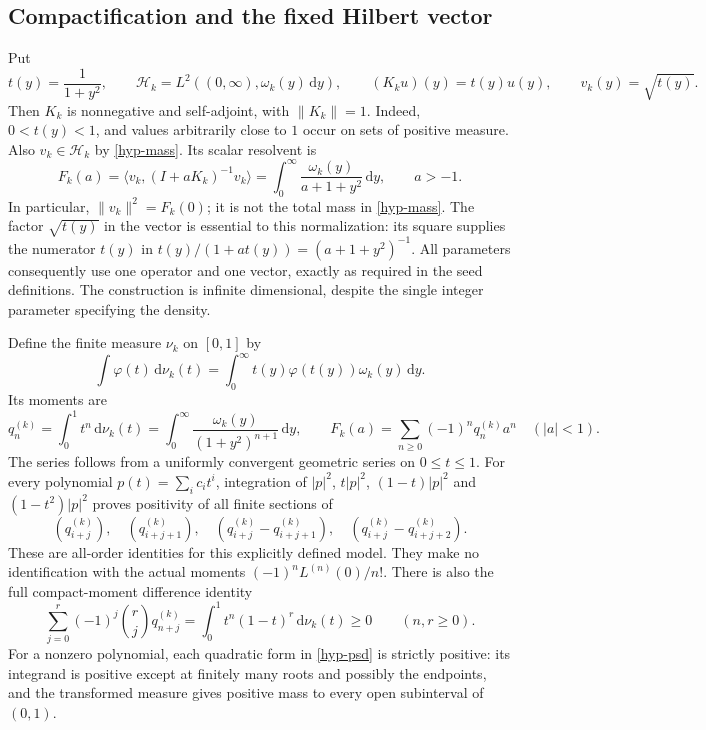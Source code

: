 \documentclass[11pt,a4paper]{article}
\numberwithin{equation}{section}
\theoremstyle{definition}
\theoremstyle{remark}
\newcommand{\HH}{\mathcal H}
\newcommand{\ip}[2]{\langle #1,#2\rangle}
\newcommand{\norm}[1]{\lVert #1\rVert}
\newcommand{\dd}{\,\mathrm d}
\begin{document}
\subsection{Compactification and the fixed Hilbert vector}

Put
\begin{equation}\label{hyp-compactification}
t(y)=\frac1{1+y^2},\qquad
\HH_k=L^2((0,\infty),\omega_k(y)\dd y),\qquad
(K_ku)(y)=t(y)u(y),\qquad v_k(y)=\sqrt{t(y)}.
\end{equation}
Then $K_k$ is nonnegative and self-adjoint, with $\norm{K_k}=1$.
Indeed, $0<t(y)<1$, and values arbitrarily close to $1$ occur on
sets of positive measure. Also $v_k\in\HH_k$ by
\eqref{hyp-mass}. Its scalar resolvent is
\begin{equation}\label{hyp-resolvent}
F_k(a)=\ip{v_k}{(I+aK_k)^{-1}v_k}
=\int_0^\infty\frac{\omega_k(y)}{a+1+y^2}\dd y,
\qquad a>-1.
\end{equation}
In particular, $\norm{v_k}^2=F_k(0)$; it is not the total mass in
\eqref{hyp-mass}.
The factor $\sqrt{t(y)}$ in the vector is essential to this
normalization: its square supplies the numerator $t(y)$ in
$t(y)/(1+at(y))=(a+1+y^2)^{-1}$. All parameters consequently use
one operator and one vector, exactly as required in the seed definitions.
The construction is infinite dimensional, despite the single integer
parameter specifying the density.

Define the finite measure $\nu_k$ on $[0,1]$ by
\[
\int\varphi(t)\dd\nu_k(t)
=\int_0^\infty t(y)\varphi(t(y))\omega_k(y)\dd y.
\]
Its moments are
\begin{equation}\label{hyp-compact-moments}
q_n^{(k)}=\int_0^1t^n\dd\nu_k(t)
=\int_0^\infty\frac{\omega_k(y)}{(1+y^2)^{n+1}}\dd y,
\qquad
F_k(a)=\sum_{n\geq0}(-1)^nq_n^{(k)}a^n\quad(|a|<1).
\end{equation}
The series follows from a uniformly convergent geometric series on
$0\leq t\leq1$. For every polynomial $p(t)=\sum_i c_it^i$,
integration of $|p|^2$, $t|p|^2$, $(1-t)|p|^2$ and
$(1-t^2)|p|^2$ proves positivity of all finite sections of
\begin{equation}\label{hyp-psd}
(q_{i+j}^{(k)}),\quad(q_{i+j+1}^{(k)}),\quad
(q_{i+j}^{(k)}-q_{i+j+1}^{(k)}),\quad
(q_{i+j}^{(k)}-q_{i+j+2}^{(k)}).
\end{equation}
These are all-order identities for this explicitly defined model.
They make no identification with the actual moments
$(-1)^nL^{(n)}(0)/n!$.
There is also the full compact-moment difference identity
\begin{equation}\label{hyp-hausdorff}
\sum_{j=0}^{r}(-1)^j\binom rj q_{n+j}^{(k)}
=\int_0^1 t^n(1-t)^r\dd\nu_k(t)\geq0
\qquad(n,r\geq0).
\end{equation}
For a nonzero polynomial, each quadratic form in
\eqref{hyp-psd} is strictly positive: its integrand is positive
except at finitely many roots and possibly the endpoints, and the
transformed measure gives positive mass to every open subinterval
of $(0,1)$.
\end{document}
